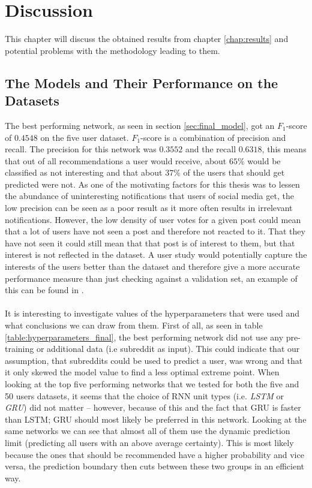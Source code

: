 \chapter{Discussion}\label{chap:discussion}

This chapter will discuss the obtained results from chapter \ref{chap:results} and potential problems with the methodology leading to them.

\section{The Models and Their Performance on the Datasets}
The best performing network, as seen in section \ref{sec:final_model}, got an $F_1$-score of $0.4548$ on the five user dataset. $F_1$-score is a combination of precision and recall. The precision for this network was $0.3552$ and the recall $0.6318$, this means that out of all recommendations a user would receive, about $65\%$ would be classified as not interesting and that about $37\%$ of the users that should get predicted were not. As one of the motivating factors for this thesis was to lessen the abundance of uninteresting notifications that users of social media get, the low precision can be seen as a poor result as it more often results in irrelevant notifications. However, the low density of user votes for a given post could mean that a lot of users have not seen a post and therefore not reacted to it. That they have not seen it could still mean that that post is of interest to them, but that interest is not reflected in the dataset. A user study would potentially capture the interests of the users better than the dataset and therefore give a more accurate performance measure than just checking against a validation set, an example of this can be found in \cite{suorra2016assisting}.
\\\\
It is interesting to investigate values of the hyperparameters that were used and what conclusions we can draw from them. First of all, as seen in table \ref{table:hyperparameters_final}, the best performing network did not use any pre-training or additional data (i.e subreddit as input). This could indicate that our assumption, that subreddits could be used to predict a user, was wrong and that it only skewed the model value to find a less optimal extreme point. When looking at the top five performing networks that we tested for both the five and 50 users datasets, it seems that the choice of RNN unit types (i.e. \textit{LSTM} or \textit{GRU}) did not matter -- however, because of this and the fact that GRU is faster than LSTM; GRU should most likely be preferred in this network. Looking at the same networks we can see that almost all of them use the dynamic prediction limit (predicting all users with an above average certainty). This is most likely because the ones that should be recommended have a higher probability and vice versa, the prediction boundary then cuts between these two groups in an efficient way.
